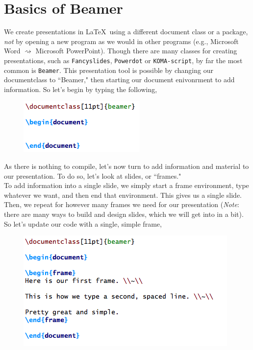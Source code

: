 \documentclass[11pt]{article}
\newcommand{\forceindent}{\leavevmode{\parindent=1.5em\indent}} %
\begin{document}
\newpage

\section{Basics of Beamer}

\forceindent We create presentations in \LaTeX\ using a different document class or a package, \textit{not} by opening a new program as we would in other programs (e.g., Microsoft Word $\rightsquigarrow$ Microsoft PowerPoint). Though there are many classes for creating presentations, such as \texttt{Fancyslides}, \texttt{Powerdot} or \texttt{KOMA-script}, by far the most common is \texttt{Beamer}. This presentation tool is possible by changing our documentclass to ``Beamer," then starting our document enivonrment to add information. So let's begin by typing the following,

\begin{figure}[!h]
	\includegraphics[scale=.5]{CODE1}
	\centering
\end{figure}

As there is nothing to compile, let's now turn to add information and material to our presentation. To do so, let's look at slides, or ``frames." \\

To add information into a single slide, we simply start a frame environment, type whatever we want, and then end that environment. This gives us a single slide. Then, we repeat for however many frames we need for our presentation (\textit{Note}: there are many ways to build and design slides, which we will get into in a bit). \\

So let's update our code with a single, simple frame,

\begin{figure}[!h]
	\includegraphics[scale=.5]{CODE2}
	\centering
\end{figure}
\end{document}
